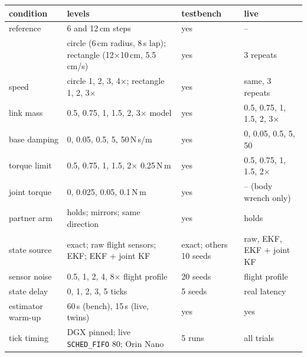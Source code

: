 \begin{tabular}{p{2.3cm}p{6.6cm}ll}
\toprule
condition & levels & testbench & live \\
\midrule
reference & 6 and 12\,cm steps & yes & -- \\
 & circle (6\,cm radius, 8\,s lap); rectangle (12$\times$10\,cm, 5.5\,cm/s) & yes & 3 repeats \\
speed & circle 1, 2, 3, 4$\times$; rectangle 1, 2, 3$\times$ & yes & same, 3 repeats \\
link mass & 0.5, 0.75, 1, 1.5, 2, 3$\times$ model & yes & 0.5, 0.75, 1, 1.5, 2, 3$\times$ \\
base damping & 0, 0.05, 0.5, 5, 50\,N\,s/m & yes & 0, 0.05, 0.5, 5, 50 \\
torque limit & 0.5, 0.75, 1, 1.5, 2$\times$ 0.25\,N\,m & yes & 0.5, 0.75, 1, 1.5, 2$\times$ \\
joint torque & 0, 0.025, 0.05, 0.1\,N\,m & yes & -- (body wrench only) \\
partner arm & holds; mirrors; same direction & yes & holds \\
state source & exact; raw flight sensors; EKF; EKF + joint KF & exact; others 10 seeds & raw, EKF, EKF + joint KF \\
sensor noise & 0.5, 1, 2, 4, 8$\times$ flight profile & 20 seeds & flight profile \\
state delay & 0, 1, 2, 3, 5 ticks & 5 seeds & real latency \\
estimator warm-up & 60\,s (bench), 15\,s (live, twins) & yes & yes \\
tick timing & DGX pinned; live \texttt{SCHED\_FIFO} 80; Orin Nano & 5 runs & all trials \\
\bottomrule
\end{tabular}
